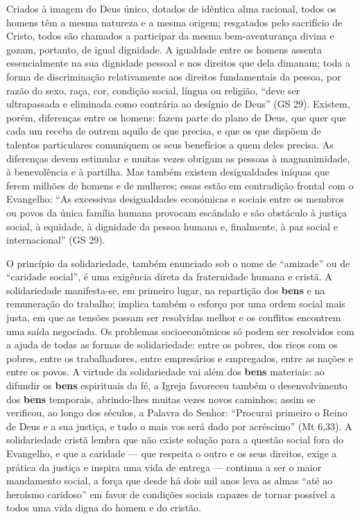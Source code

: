 Criados à imagem do Deus único, dotados de idêntica alma racional, todos os homens têm a mesma natureza e a mesma origem; resgatados pelo sacrifício de Cristo, todos são chamados a participar da mesma bem-aventurança divina e gozam, portanto, de igual dignidade. A igualdade entre os homens assenta essencialmente na sua dignidade pessoal e nos direitos que dela dimanam; toda a forma de discriminação relativamente aos direitos fundamentais da pessoa, por razão do sexo, raça, cor, condição social, língua ou religião, ``deve ser ultrapassada e eliminada como contrária ao desígnio de Deus'' (GS 29). Existem, porém, diferenças entre os homens: fazem parte do plano de Deus, que quer que cada um receba de outrem aquilo de que precisa, e que os que dispõem de talentos particulares comuniquem os seus benefícios a quem deles precisa. As diferenças devem estimular e muitas vezes obrigam as pessoas à magnanimidade, à benevolência e à partilha. Mas também existem desigualdades iníquas que ferem milhões de homens e de mulheres; essas estão em contradição frontal com o Evangelho: ``As excessivas desigualdades económicas e sociais entre os membros ou povos da única família humana provocam escândalo e são obstáculo à justiça social, à equidade, à dignidade da pessoa humana e, finalmente, à paz social e internacional'' (GS 29).

O princípio da solidariedade, também enunciado sob o nome de ``amizade'' ou de ``caridade social'', é uma exigência direta da fraternidade humana e cristã. A solidariedade manifesta-se, em primeiro lugar, na repartição dos \textbf{bens} e na remuneração do trabalho; implica também o esforço por uma ordem social mais justa, em que as tensões possam ser resolvidas melhor e os conflitos encontrem uma saída negociada. Os problemas socioeconômicos só podem ser resolvidos com a ajuda de todas as formas de solidariedade: entre os pobres, dos ricos com os pobres, entre os trabalhadores, entre empresários e empregados, entre as nações e entre os povos. A virtude da solidariedade vai além dos \textbf{bens} materiais: ao difundir os \textbf{bens} espirituais da fé, a Igreja favoreceu também o desenvolvimento dos \textbf{bens} temporais, abrindo-lhes muitas vezes novos caminhos; assim se verificou, ao longo dos séculos, a Palavra do Senhor: ``Procurai primeiro o Reino de Deus e a sua justiça, e tudo o mais vos será dado por acréscimo'' (Mt 6,33). A solidariedade cristã lembra que não existe solução para a questão social fora do Evangelho, e que a caridade --- que respeita o outro e os seus direitos, exige a prática da justiça e inspira uma vida de entrega --- continua a ser o maior mandamento social, a força que desde há dois mil anos leva as almas ``até ao heroísmo caridoso'' em favor de condições sociais capazes de tornar possível a todos uma vida digna do homem e do cristão.
